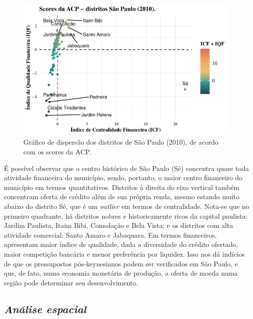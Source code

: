 \documentclass[a4paper,12pt]{article}
\begin{document}
\begin{figure}

\caption{\label{fig-scores}Gráfico de dispersão dos distritos de São
Paulo (2010), de acordo com os scores da ACP.}

{\centering \includegraphics{main_files/figure-pdf/fig-scores-1.pdf}

}

\end{figure}

É possível observar que o centro histórico de São Paulo (Sé) concentra
quase toda atividade financeira do município, sendo, portanto, o maior
centro financeiro do município em termos quantitativos. Distritos à
direita do eixo vertical também concentram oferta de crédito além de sua
própria renda, mesmo estando muito abaixo do distrito Sé, que é um
\emph{outlier} em termos de centralidade. Nota-se que no primeiro
quadrante, há distritos nobres e historicamente ricos da capital
paulista: Jardim Paulista, Itaim Bibi, Consolação e Bela Vista; e os
distritos com alta atividade comercial: Santo Amaro e Jabaquara. Em
termos financeiros, apresentam maior índice de qualidade, dada a
diversidade do crédito ofertado, maior competição bancária e menor
preferência por liquidez. Isso nos dá indícios de que os pressupostos
pós-keynesianos podem ser verificados em São Paulo, e que, de fato, numa
economia monetária de produção, a oferta de moeda numa região pode
determinar seu desenvolvimento.

\newpage

\hypertarget{anuxe1lise-espacial-1}{%
\subsection{\texorpdfstring{\emph{Análise
espacial}}{Análise espacial}}\label{anuxe1lise-espacial-1}}
\end{document}

